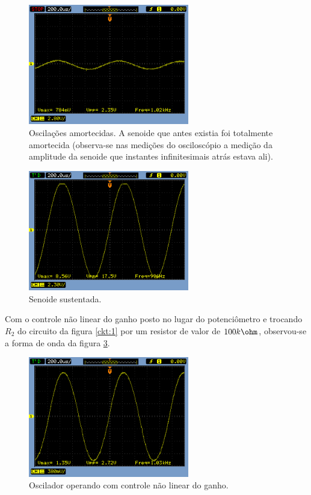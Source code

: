 \begin{figure}[H] 
\centering
\includegraphics[width=7cm]{images/not.png}
\caption{Oscilações amortecidas. A senoide que antes existia foi totalmente amortecida (observa-se nas medições do osciloscópio a medição da amplitude da senoide que instantes infinitesimais atrás estava ali).}
\label{fig:2} 
\end{figure}


\begin{figure}[H] 
\centering
\includegraphics[width=7cm]{images/pot.png}
\caption{Senoide sustentada.}
\label{fig:3} 
\end{figure}

Com o controle não linear do ganho posto no lugar do potenciômetro e trocando $R_2$ do circuito da figura \ref{ckt:1} por um resistor de valor de $100k\ohm$, observou-se a forma de onda da figura \ref{fig:4}.

\begin{figure}[H] 
\centering
\includegraphics[width=7cm]{images/100k.png}
\caption{Oscilador operando com controle não linear do ganho.}
\label{fig:4} 
\end{figure}

